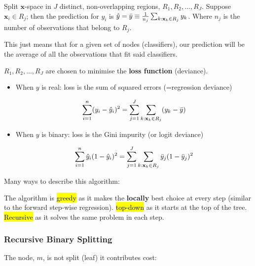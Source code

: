 \documentclass[11pt]{article}
\begin{document}
\begin{definition}
    Split $\mathbf{x}$-space in $J$ distinct, non-overlapping regions, $R_1, R_2, \ldots, R_J$. Suppose $\mathbf{x}_i \in R_j$; then the prediction for $y_i$ is $\hat{y} = \Bar{y} \equiv \frac{1}{n_j}\sum_{k:\mathbf{x}_k\in R_j} y_k$. Where $n_j$ is the number of observations that belong to $R_j$.

    \begin{note}
        This just means that for a given set of nodes (classifiers), our prediction will be the average of all the observations that fit said classifiers.
    \end{note}

    $R_1, R_2, \ldots, R_J$ are chosen to minimise the \textbf{loss function} (deviance).

    \begin{itemize}
        \item When $y$ is real: loss is the sum of squared errors (=regression deviance)

        \begin{equation*}
            \sum_{i=1}^n(y_i - \hat{y}_i)^2 = \sum_{j=1}^J \sum_{k:\mathbf{x}_k\in R_j}(y_k - \Bar{y})
        \end{equation*}

        \item When $y$ is binary: loss is the Gini impurity (or logit deviance)

        \begin{equation*}
            \sum_{i=1}^n \hat{y}_i(1-\hat{y}_i)^2 = \sum_{j=1}^J \sum_{k:\mathbf{x}_k\in R_j} \Bar{y}_j(1-\Bar{y}_j)^2
        \end{equation*}
    \end{itemize}
\end{definition}

Many ways to describe this algorithm:

The algorithm is \hl{greedy} as it makes the \textbf{locally} best choice at every step (similar to the forward step-wise regression). \hl{top-down} as it starts at the top of the tree. \hl{Recursive} as it solves the same problem in each step.

\subsubsection{Recursive Binary Splitting}

The node, $m$, is not split (leaf) it contributes cost:
\end{document}
